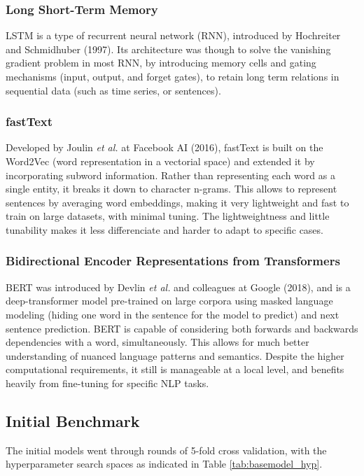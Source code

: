 \documentclass[conference]{IEEEtran}
\begin{document}
\subsubsection{Long Short-Term Memory}

LSTM is a type of recurrent neural network (RNN), introduced by Hochreiter and Schmidhuber (1997). Its architecture was though to solve the vanishing gradient problem in most RNN, by introducing memory cells and gating mechanisms (input, output, and forget gates), to retain long term relations in sequential data (such as time series, or sentences).

\subsubsection{fastText}

Developed by Joulin \textit{et al.} at Facebook AI (2016), fastText is built on the Word2Vec (word representation in a vectorial space) and extended it by incorporating subword information. Rather than representing each word as a single entity, it breaks it down to character n-grams. This allows to represent sentences by averaging word embeddings, making it very lightweight and fast to train on large datasets, with minimal tuning. The lightweightness and little tunability makes it less differenciate and harder to adapt to specific cases.

\subsubsection{Bidirectional Encoder Representations from Transformers}

BERT was introduced by Devlin \textit{et al.} and colleagues at Google (2018), and is a deep-transformer model pre-trained on large corpora using masked language modeling (hiding one word in the sentence for the model to predict) and next sentence prediction. BERT is capable of considering both forwards and backwards dependencies with a word, simultaneously. This allows for much better understanding of nuanced language patterns and semantics. Despite the higher computational requirements, it still is manageable at a local level, and benefits heavily from fine-tuning for specific NLP tasks.

\subsection{Initial Benchmark}

The initial models went through rounds of 5-fold cross validation, with the hyperparameter search spaces as indicated in Table \ref{tab:basemodel_hyp}.
\end{document}
